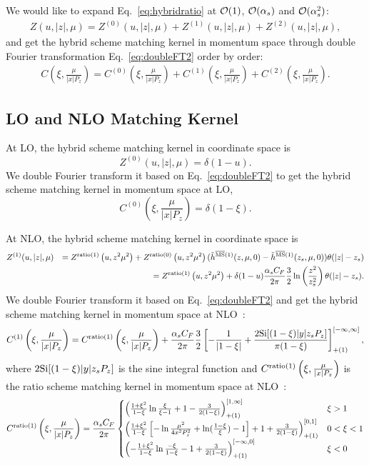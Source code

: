 \documentclass[prd,aps,twocolumn,preprintnumbers, showpacs, nofootinbib,superscriptaddress,notitlepage]{revtex4-2}
\def\bea{\begin{eqnarray}}
\def\eea{\end{eqnarray}}
\begin{document}
We would like to expand Eq.~\eqref{eq:hybridratio} at ${\cal O}(1)$, ${\cal O}(\alpha_s)$ and ${\cal O}(\alpha_s^2)$:
\bea
Z(u,|z|,\mu) = Z^{(0)}(u,|z|,\mu) + Z^{(1)}(u,|z|,\mu) + Z^{(2)}(u,|z|,\mu),
\eea
and get the hybrid scheme matching kernel in momentum space through double Fourier transformation Eq.~\eqref{eq:doubleFT2} order by order:
\bea
C\left(\xi, \frac{\mu}{|x| P_{z}}\right)=C^{(0)}\left(\xi, \frac{\mu}{|x| P_{z}}\right)+C^{(1)}\left(\xi, \frac{\mu}{|x| P_{z}}\right)+C^{(2)}\left(\xi, \frac{\mu}{|x| P_{z}}\right).
\eea

\subsection{LO and NLO Matching Kernel}
At LO, the hybrid scheme matching kernel in coordinate space is
$$Z^{(0)}(u,|z|,\mu)=\delta(1-u).$$
We double Fourier transform it based on Eq.~\eqref{eq:doubleFT2} to get the hybrid scheme matching kernel in momentum space at LO, 
$$C^{(0)}\left(\xi, \frac{\mu}{|x| P_{z}}\right)=\delta(1-\xi).$$

At NLO, the hybrid scheme matching kernel in coordinate space is
\bea
Z^{(1)}(u,|z|,\mu)&&=Z^{\rm ratio(1)}\left(u,z^{2} \mu^{2}\right) + Z^{\rm ratio(0)}\left(u,z^{2} \mu^{2}\right)(\tilde{h}^{\overline{\rm MS}(1)}(z, \mu, 0)-\tilde{h}^{\overline{\rm MS}(1)}(z_s, \mu, 0))\theta(|z|-z_s) \nonumber\\
&&=Z^{\rm ratio(1)}\left(u,z^{2} \mu^{2}\right)+\delta(1-u)\frac{\alpha_s C_{F}}{2 \pi}\frac{3}{2}\ln\left(\frac{z^{2}}{z_s^{2}}\right)\theta(|z|-z_s).
\eea
We double Fourier transform it based on Eq.~\eqref{eq:doubleFT2} and get the hybrid scheme matching kernel in momentum space at NLO~\cite{Chou:2022drv}:
\bea\label{eq:hybridkernelNLO}
C^{(1)}\left(\xi,\frac{\mu}{|x|P_{z}}\right) = C^{\rm ratio(1)}\left(\xi, \frac{\mu}{|x| P_{z}}\right) + \frac{\alpha_s C_{F}}{2 \pi}\frac{3}{2} \left[-\frac{1}{|1-\xi|}+\frac{2 {\rm Si}[(1-\xi)|y| z_s P_z]}{\pi (1-\xi)} \right]_{+(1)}^{[-\infty,\infty]},
\eea
where $2 {\rm Si}[(1-\xi)|y| z_s P_z]$ is the sine integral function and $C^{\rm ratio(1)}\left(\xi, \frac{\mu}{|x| P_{z}}\right)$ is the ratio scheme matching kernel in momentum space at NLO~\cite{Izubuchi:2018srq}:
\bea\label{eq:ratiokernelNLO}
C^{\rm ratio(1)}\left(\xi, \frac{\mu}{|x| P_{z}}\right)= \frac{\alpha_{s} C_{F}}{2 \pi} \begin{cases}\left(\frac{1+\xi^{2}}{1-\xi} \ln \frac{\xi}{\xi-1}+1-\frac{3}{2(1-\xi)}\right)_{+(1)}^{[1, \infty]} & \xi>1 \\ \left(\frac{1+\xi^{2}}{1-\xi}\left[-\ln \frac{\mu^{2}}{4 x^{2} P_{z}^{2}}+\ln (\frac{1-\xi}{\xi})-1\right]+1+\frac{3}{2(1-\xi)}\right)_{+(1)}^{[0,1]} & 0<\xi<1 \\ \left(-\frac{1+\xi^{2}}{1-\xi} \ln \frac{-\xi}{1-\xi}-1+\frac{3}{2(1-\xi)}\right)_{+(1)}^{[-\infty, 0]} & \xi<0 \end{cases}
\eea
\end{document}
